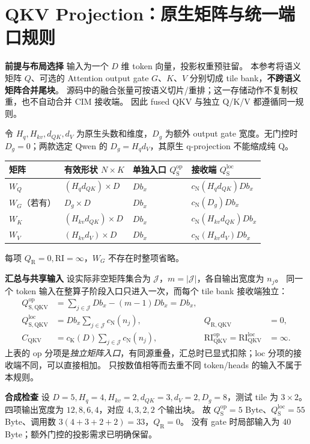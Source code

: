 \documentclass[11pt,a4paper,fontset=fandol]{ctexart}
\newcommand{\RI}{\mathrm{RI}}
\newcommand{\op}{\mathrm{op}}
\newcommand{\loc}{\mathrm{loc}}
\newcommand{\cn}[1]{c_{\mathrm N}\!\left(#1\right)}
\newcommand{\ck}[1]{c_{\mathrm K}\!\left(#1\right)}
\newcommand{\qs}{Q_{\mathrm S}}
\newcommand{\qr}{Q_{\mathrm R}}
\newcommand{\qso}{Q_{\mathrm S}^{\op}}
\newcommand{\qsl}{Q_{\mathrm S}^{\loc}}
\newcommand{\para}[1]{\par\smallskip\noindent\textbf{#1}\quad}
\begin{document}
\clearpage
\section{QKV Projection：原生矩阵与统一端口规则}
\para{前提与布局选择}
输入为一个 $D$ 维 token 向量，投影权重预驻留。
本参考将语义矩阵 $Q$、可选的 Attention output gate $G$、$K$、$V$ 分别切成 tile bank，\textbf{不跨语义矩阵合并尾块}。
源码中的融合张量可按语义切片/重排；这一存储动作不复制权重，也不自动合并 CIM 接收端。
因此 fused QKV 与独立 Q/K/V 都遵循同一规则。

令 $H_q,H_{kv},d_{QK},d_V$ 为原生头数和维度，$D_g$ 为额外 output gate 宽度。无门控时 $D_g=0$；两款选定 Qwen 的 $D_g=H_qd_V$，其原生 q-projection 不能缩成纯 Q\cite{qwenimpl,models}。
\begin{center}\small
\begin{tabular}{@{}llll@{}}\toprule
矩阵 & 有效形状 $N\times K$ & 单独入口 $\qs^\op$ & 接收端 $\qs^\loc$\\\midrule
$W_Q$ & $(H_qd_{QK})\times D$ & $Db_x$ & $\cn{H_qd_{QK}}Db_x$\\
$W_G$（若有） & $D_g\times D$ & $Db_x$ & $\cn{D_g}Db_x$\\
$W_K$ & $(H_{kv}d_{QK})\times D$ & $Db_x$ & $\cn{H_{kv}d_{QK}}Db_x$\\
$W_V$ & $(H_{kv}d_V)\times D$ & $Db_x$ & $\cn{H_{kv}d_V}Db_x$\\\bottomrule
\end{tabular}\end{center}
每项 $\qr=0,\RI=\infty$，$W_G$ 不存在时整项省略。

\para{汇总与共享输入}
设实际非空矩阵集合为 $\mathcal J$，$m=|\mathcal J|$，各自输出宽度为 $n_j$。
同一个 token 输入在整算子阶段入口只进入一次，而每个 tile bank 接收端独立：
\begin{align}
Q_{\mathrm{S,QKV}}^{\op}
 &=\sum_{j\in\mathcal J}Db_x-(m-1)Db_x=Db_x,\\
Q_{\mathrm{S,QKV}}^{\loc}
 &=Db_x\sum_{j\in\mathcal J}\cn{n_j},&
Q_{\mathrm{R,QKV}}&=0,\\
C_{\mathrm{QKV}}&=\ck{D}\sum_{j\in\mathcal J}\cn{n_j},&
\RI_{\mathrm{QKV}}^{\op}=\RI_{\mathrm{QKV}}^{\loc}&=\infty.
\end{align}
上表的 $\op$ 分项是\emph{独立矩阵入口}，有同源重叠，汇总时已显式扣除；$\loc$ 分项的接收端不同，可以直接相加。
只按数值相等而去重不同 token/heads 的输入不属于本规则。

\para{合成检查}
设 $D=5,H_q=4,H_{kv}=2,d_{QK}=3,d_V=2,D_g=8$，测试 tile 为 $3\times2$。
四项输出宽度为 $12,8,6,4$，对应 $4,3,2,2$ 个输出块。
故 $\qso=5$ Byte、$\qsl=55$ Byte、调用数 $3(4+3+2+2)=33$，$\qr=0$。
没有 gate 时局部输入为 40 Byte；额外门控的投影需求已明确保留。
\end{document}
